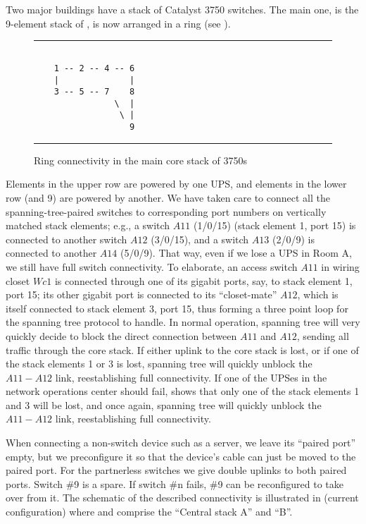 Two major buildings have a stack of {\cisco} Catalyst 3750 switches.
The main one, is the 9-element stack of {\BigSwitchOne}, is now arranged in a ring
(see ).
\begin{figure}[htpb!]\hrule
\begin{verbatim}

    1 -- 2 -- 4 -- 6
    |              |
    3 -- 5 -- 7    8
                \  |
                 \ |
                   9
\end{verbatim}
\hrule
\caption{Ring connectivity in the main core stack of 3750s}\label{fig:stack-ring}\end{figure}
Elements in the upper row are powered by one UPS, and
elements in the lower row (and 9) are powered by another.
We have taken care to connect all the spanning-tree-paired switches
to corresponding port numbers on vertically matched stack elements;
e.g., a switch $A11$ (1/0/15) (stack element 1, port 15) is connected to another switch $A12$ (3/0/15), and
a switch $A13$ (2/0/9) is connected to another $A14$ (5/0/9).  That way,
even if we lose a UPS in Room A, we still have full switch
connectivity.
To elaborate, an access switch $A11$ in wiring closet $Wc1$ is connected through
one of its gigabit ports, say, to stack element 1, port 15; its
other gigabit port is connected to its ``closet-mate'' $A12$, which
is itself connected to stack element 3, port 15, thus forming
a three point loop for the spanning tree protocol to handle.
In normal operation, spanning tree will very quickly decide
to block the direct connection between $A11$ and $A12$, sending
all traffic through the core stack. If either uplink to the
core stack is lost, or if one of the stack elements 1 or 3
is lost, spanning tree will quickly unblock the $A11-A12$ link,
reestablishing full connectivity. If one of the UPSes in the
network operations center should fail,  shows that
only one of the stack elements 1 and 3 will be lost, and once
again, spanning tree will quickly unblock the $A11-A12$ link,
reestablishing full connectivity.

When connecting a non-switch device such as a server, we
leave its ``paired port'' empty, but we preconfigure
it so that the device's cable can just be moved to the
paired port.
For the partnerless switches we give
double uplinks to both paired ports.
Switch \#9 is a spare. If switch \#n fails, \#9 can 
be reconfigured to take over from it.
The schematic of the described connectivity is illustrated
in  (current configuration) where {\BigSwitchOne}
and {\BigSwitchTwo} comprise the ``Central stack A'' and ``B''.


